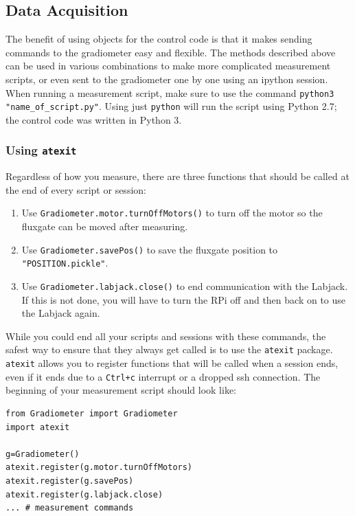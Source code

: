 \documentclass{TheMartianReport}
\newcommand{\pyinline}[1]{\texttt{#1}}
\newcommand{\shellinline}[1]{\texttt{#1}}
\begin{document}
\subsection{Data Acquisition} \label{subsec:Acquisition}
The benefit of using objects for the control code is that it makes sending commands to the gradiometer easy and flexible. The methods described above can be used in various combinations to make more complicated measurement scripts, or even sent to the gradiometer one by one using an ipython session. When running a measurement script, make sure to use the command \shellinline{python3 "name_of_script.py"}. Using just \shellinline{python} will run the script using Python 2.7; the control code was written in Python 3.

\subsubsection{Using \pyinline{atexit}}
Regardless of how you measure, there are three functions that should be called at the end of every script or session:
\begin{enumerate}
	\item Use \pyinline{Gradiometer.motor.turnOffMotors()} to turn off the motor so the fluxgate can be moved after measuring.
	\item Use \pyinline{Gradiometer.savePos()} to save the fluxgate position to \shellinline{"POSITION.pickle"}.
	\item Use \pyinline{Gradiometer.labjack.close()} to end communication with the Labjack. If this is not done, you will have to turn the RPi off and then back on to use the Labjack again.
\end{enumerate}
While you could end all your scripts and sessions with these commands, the safest way to ensure that they always get called is to use the \pyinline{atexit} package. \pyinline{atexit} allows you to register functions that will be called when a session ends, even if it ends due to a \shellinline{Ctrl+c} interrupt or a dropped ssh connection. The beginning of your measurement script should look like:
\begin{verbatim}
from Gradiometer import Gradiometer
import atexit

g=Gradiometer()
atexit.register(g.motor.turnOffMotors)
atexit.register(g.savePos)
atexit.register(g.labjack.close)
... # measurement commands
\end{verbatim}
\end{document}

